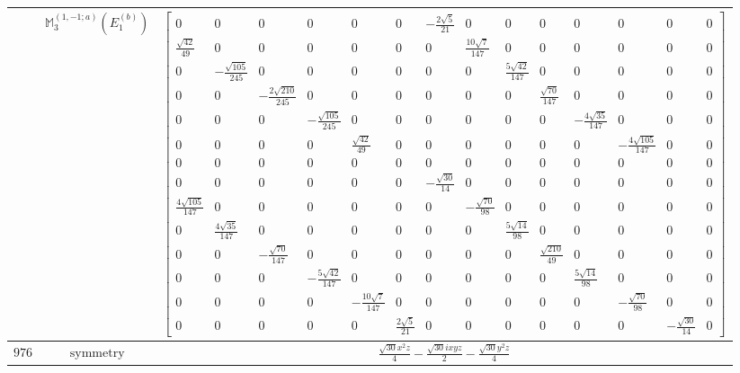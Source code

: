 \documentclass[fleqn,8pt,landscape]{jsarticle}
\begin{document}
\begin{longtable}{ccc}
$  $ & $ \mathbb{M}_{3}^{(1,-1;a)}(E_{1}^{(b)}) $ & $ \begin{bmatrix} 0 & 0 & 0 & 0 & 0 & 0 & - \frac{2 \sqrt{5}}{21} & 0 & 0 & 0 & 0 & 0 & 0 & 0 \\ \frac{\sqrt{42}}{49} & 0 & 0 & 0 & 0 & 0 & 0 & \frac{10 \sqrt{7}}{147} & 0 & 0 & 0 & 0 & 0 & 0 \\ 0 & - \frac{\sqrt{105}}{245} & 0 & 0 & 0 & 0 & 0 & 0 & \frac{5 \sqrt{42}}{147} & 0 & 0 & 0 & 0 & 0 \\ 0 & 0 & - \frac{2 \sqrt{210}}{245} & 0 & 0 & 0 & 0 & 0 & 0 & \frac{\sqrt{70}}{147} & 0 & 0 & 0 & 0 \\ 0 & 0 & 0 & - \frac{\sqrt{105}}{245} & 0 & 0 & 0 & 0 & 0 & 0 & - \frac{4 \sqrt{35}}{147} & 0 & 0 & 0 \\ 0 & 0 & 0 & 0 & \frac{\sqrt{42}}{49} & 0 & 0 & 0 & 0 & 0 & 0 & - \frac{4 \sqrt{105}}{147} & 0 & 0 \\ 0 & 0 & 0 & 0 & 0 & 0 & 0 & 0 & 0 & 0 & 0 & 0 & 0 & 0 \\ 0 & 0 & 0 & 0 & 0 & 0 & - \frac{\sqrt{30}}{14} & 0 & 0 & 0 & 0 & 0 & 0 & 0 \\ \frac{4 \sqrt{105}}{147} & 0 & 0 & 0 & 0 & 0 & 0 & - \frac{\sqrt{70}}{98} & 0 & 0 & 0 & 0 & 0 & 0 \\ 0 & \frac{4 \sqrt{35}}{147} & 0 & 0 & 0 & 0 & 0 & 0 & \frac{5 \sqrt{14}}{98} & 0 & 0 & 0 & 0 & 0 \\ 0 & 0 & - \frac{\sqrt{70}}{147} & 0 & 0 & 0 & 0 & 0 & 0 & \frac{\sqrt{210}}{49} & 0 & 0 & 0 & 0 \\ 0 & 0 & 0 & - \frac{5 \sqrt{42}}{147} & 0 & 0 & 0 & 0 & 0 & 0 & \frac{5 \sqrt{14}}{98} & 0 & 0 & 0 \\ 0 & 0 & 0 & 0 & - \frac{10 \sqrt{7}}{147} & 0 & 0 & 0 & 0 & 0 & 0 & - \frac{\sqrt{70}}{98} & 0 & 0 \\ 0 & 0 & 0 & 0 & 0 & \frac{2 \sqrt{5}}{21} & 0 & 0 & 0 & 0 & 0 & 0 & - \frac{\sqrt{30}}{14} & 0 \end{bmatrix} $ \\ \hline
$ 976 $ & $ \text{symmetry} $ & $ \frac{\sqrt{30} x^{2} z}{4} - \frac{\sqrt{30} i x y z}{2} - \frac{\sqrt{30} y^{2} z}{4} $ \\

\end{longtable}
\end{document}
